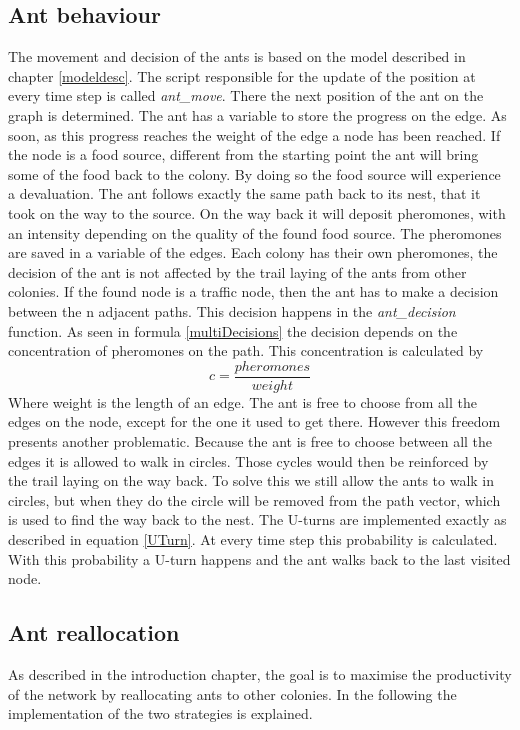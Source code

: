 \subsection{Ant behaviour}
The movement and decision of the ants is based on the model described in chapter \ref{modeldesc}. The script responsible for the update of the position at every time step is called \textit{ant\_move}. There the next position of the ant on the graph is determined. The ant has a variable to store the progress on the edge. As soon, as this progress reaches the weight of the edge a node has been reached. If the node is a food source, different from the starting point the ant will bring some of the food back to the colony. By doing so the food source will experience a devaluation. The ant follows exactly the same path back to its nest, that it took on the way to the source. On the way back it will deposit pheromones, with an intensity depending on the quality of the found food source. The pheromones are saved in a variable of the edges. Each colony has their own pheromones, the decision of the ant is not affected by the trail laying of the ants from other colonies.
If the found node is a traffic node, then the ant has to make a decision between the n adjacent paths. This decision happens in the \textit{ant\_decision} function. As seen in formula \ref{multiDecisions} the decision depends on the concentration of pheromones on the path. This concentration is calculated by
\begin{equation}
c = \frac{pheromones}{weight}
\end{equation}
Where weight is the length of an edge. The ant is free to choose from all the edges on the node, except for the one it used to get there.
However this freedom presents another problematic. Because the ant is free to choose between all the edges it is allowed to walk in circles. Those cycles would then be reinforced by the trail laying on the way back. To solve this we still allow the ants to walk in circles, but when they do the circle will be removed from the path vector, which is used to find the way back to the nest.
The U-turns are implemented exactly as described in equation \ref{UTurn}. At every time step this probability is calculated. With this probability a U-turn happens and the ant walks back to the last visited node. 
\subsection{Ant reallocation}
As described in the introduction chapter, the goal is to maximise the productivity of the network by reallocating ants to other colonies. In the following the implementation of the two strategies is explained.
